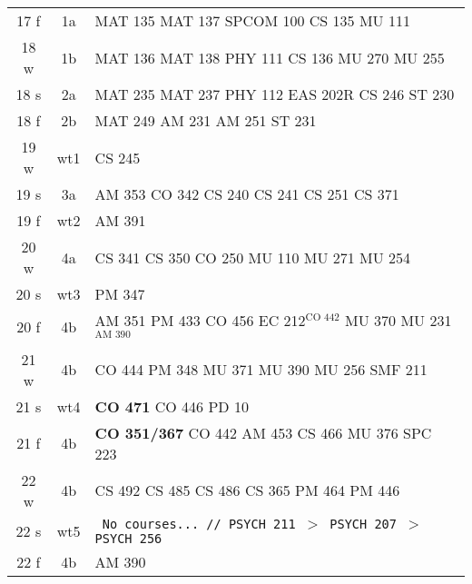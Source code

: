 \documentclass[convert]{standalone}
\begin{document}
\begin{tabular}{|c | c | l |}
	\hline
	17 f & 1a & MAT 135 \quad MAT 137 \quad SPCOM 100 \quad CS 135 \quad MU 111 \\
	18 w & 1b & MAT 136 \quad MAT 138 \quad PHY 111 \quad CS 136 \quad MU 270 \quad MU 255\\
	18 s & 2a & MAT 235 \quad MAT 237 \quad PHY 112 \quad EAS 202R \quad CS 246 \quad ST  230 \\
	18 f & 2b & MAT 249 \quad AM 231 \quad AM 251 \quad ST  231 \\
	19 w & wt1 & CS 245 \\
	19 s & 3a & AM 353 \quad CO 342 \quad CS 240 \quad CS 241 \quad CS 251 \quad CS 371 \\
	19 f & wt2 & AM 391 \\
	20 w & 4a & CS 341 \quad CS 350 \quad CO 250  \quad MU 110 \quad MU 271 \quad MU 254 \\
	20 s & wt3 & PM 347 \\
	20 f & 4b & AM 351  \quad PM 433  \quad CO 456 \quad EC 212$^{\text{CO 442}}$  \quad MU 370 \quad MU 231$^{\text{AM 390}}$  \\
	21 w & 4b & CO 444 \quad PM 348   \quad MU 371   \quad MU 390 \quad MU 256 \quad SMF 211 \\
	21 s & wt4 & {\color{red}\textbf{CO 471}} \quad CO 446 \quad PD 10  \\
	21 f & 4b &{\color{white} \textbf{CO 351/367}} \quad CO 442  \quad AM 453 \quad CS 466 \quad MU 376 \quad SPC 223      \\
	22 w & 4b & CS 492  \quad CS 485 \quad CS 486 \quad CS 365 \quad PM 464 \quad PM 446     \\
	22 s & wt5 & {\tt  \color{gray} No courses... // PSYCH 211 $>$ PSYCH 207 $>$ PSYCH 256} \\
	22 f & 4b &  AM 390   \\\hline

\end{tabular}
\end{document}

